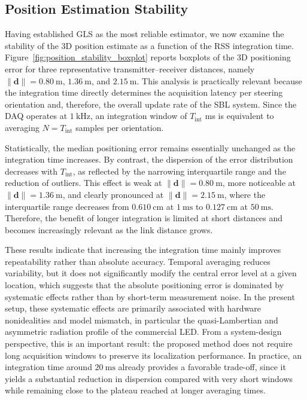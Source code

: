 \documentclass[conference]{IEEEtran}
\begin{document}
\subsection{Position Estimation Stability}
\label{subsec:position_estimation_stability}
{\color{blue}
Having established GLS as the most reliable estimator, we now examine the stability of the 3D position estimate as a function of the RSS integration time. Figure~\ref{fig:position_stability_boxplot} reports boxplots of the 3D positioning error for three representative transmitter--receiver distances, namely $\|\mathbf{d}\|=0.80~\mathrm{m}$, $1.36~\mathrm{m}$, and $2.15~\mathrm{m}$. 
This analysis is practically relevant because the integration time directly determines the acquisition latency per steering orientation and, therefore, the overall update rate of the SBL system. Since the DAQ operates at $1~\mathrm{kHz}$, an integration window of $T_{\mathrm{int}}$ ms is equivalent to averaging $N=T_{\mathrm{int}}$ samples per orientation.

Statistically, the median positioning error remains essentially unchanged as the integration time increases. By contrast, the dispersion of the error distribution decreases with $T_{\mathrm{int}}$, as reflected by the narrowing interquartile range and the reduction of outliers. This effect is weak at $\|\mathbf{d}\|=0.80~\mathrm{m}$, more noticeable at $\|\mathbf{d}\|=1.36~\mathrm{m}$, and clearly pronounced at $\|\mathbf{d}\|=2.15~\mathrm{m}$, where the interquartile range decreases from $0.610~\mathrm{cm}$ at $1~\mathrm{ms}$ to $0.127~\mathrm{cm}$ at $50~\mathrm{ms}$.
Therefore, the benefit of longer integration is limited at short distances and becomes increasingly relevant as the link distance grows.

These results indicate that increasing the integration time mainly improves repeatability rather than absolute accuracy. Temporal averaging reduces variability, but it does not significantly modify the central error level at a given location, which suggests that the absolute positioning error is dominated by systematic effects rather than by short-term measurement noise. In the present setup, these systematic effects are primarily associated with hardware nonidealities and model mismatch, in particular the quasi-Lambertian and asymmetric radiation profile of the commercial LED. From a system-design perspective, this is an important result: the proposed method does not require long acquisition windows to preserve its localization performance. In practice, an integration time around $20~\mathrm{ms}$ already provides a favorable trade-off, since it yields a substantial reduction in dispersion compared with very short windows while remaining close to the plateau reached at longer averaging times.
}
\end{document}
